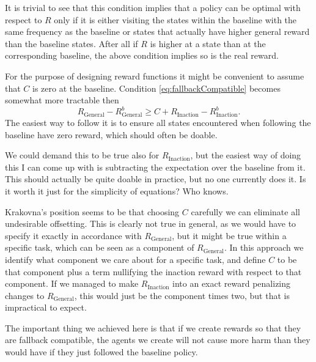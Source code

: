 \documentclass{article}
\newcommand{\rewardFunction}{R}
\newcommand{\generalRewardFunction}{\rewardFunction_{\mathrm{General}}}
\newcommand{\inactionRewardFunction}{\rewardFunction_{\mathrm{Inaction}}}
\newcommand{\corruption}{C}
\newcommand{\baseline}{b}
\begin{document}
		It is trivial to see that this condition implies that a policy can be optimal with respect to
		$\rewardFunction$ only if it is either visiting the states within the baseline with the same
		frequency as the baseline	or states that actually have higher general reward than the baseline
		states. After all if $\rewardFunction$ is higher at a state than at the corresponding baseline,
		the above condition implies so is the real reward.

		For the purpose of designing reward functions it might be convenient to assume
		that $\corruption$ is zero at the baseline. Condition \eqref{eq:fallbackCompatible}
		becomes somewhat more tractable then
		\begin{equation*}
				\generalRewardFunction - \generalRewardFunction^\baseline \geq
				\corruption + \inactionRewardFunction - \inactionRewardFunction^\baseline.
		\end{equation*}
		The easiest way to follow it is to ensure all states encountered
		when following the baseline have zero reward, which should often be doable.

		We could demand this to be true also for $\inactionRewardFunction$, but the easiest way of
		doing this I can come up with is subtracting the expectation over the baseline from it.
		This should actually be quite doable in practice, but no one currently does it.
		Is it worth it just for the simplicity of equations? Who knows.

		Krakovna's position seems to be that choosing $\corruption$ carefully we can eliminate
		all undesirable offsetting. This is clearly not true in general, as we would have to specify
		it exactly in accordance with $\generalRewardFunction$, but it might be true within
		a specific task, which can be seen as a component of $\generalRewardFunction$. In this
		approach we identify what component we care about for a specific task, and define
		$\corruption$ to be that component plus a term nullifying the inaction reward
		with respect to that component. If we managed to make $\inactionRewardFunction$
		into an exact reward penalizing changes to $\generalRewardFunction$, this would just be
		the component times two, but that is impractical to expect.

		The important thing we achieved here is that if we create rewards so that they are fallback
		compatible, the agents we create will not cause more harm than they would have if they
		just followed the baseline policy.

	\appendix
\end{document}
